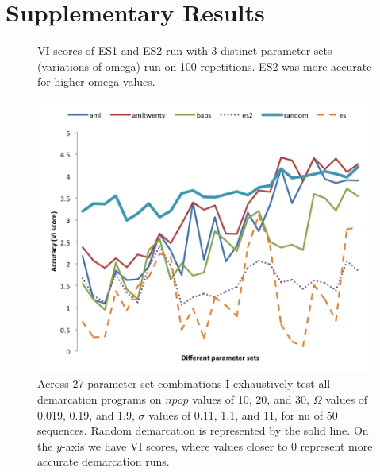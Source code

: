 \chapter{Supplementary Results}
\begin{figure}[h!]
\centering
\noindent{}
\caption[Output file of ES1, ES2 comparison query.]{VI scores of ES1 and ES2 run with 3 distinct parameter sets (variations of omega) run on 100 repetitions. ES2 was more accurate for higher omega values.}
\label{fig:HundredResultsFile}
\end{figure}


\begin{figure}[h!]
  \centering
    \includegraphics[scale=0.75]{images/ResultGraphs/ResultGraphs-3}
      \caption[All demarcation graphical accuracy visualization on $nu = 50$.]{Across 27 parameter set combinations I exhaustively test all demarcation programs on $npop$ values of 10, 20, and 30, $\Omega$ values of 0.019, 0.19, and 1.9, $\sigma$ values of 0.11, 1.1, and 11, for nu of 50 sequences. Random demarcation is represented by the solid line. On the $y$-axis we have VI scores, where values closer to 0 represent more accurate demarcation runs.}
    \label{fig:All50}
\end{figure}

